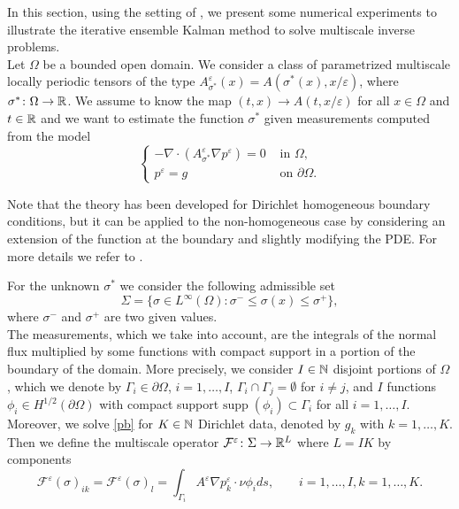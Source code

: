 In this section, using the setting of \cite{AbD18}, we present some numerical experiments to illustrate the iterative ensemble Kalman method to solve multiscale inverse problems. \\
Let $\Omega$ be a bounded open domain. We consider a class of parametrized multiscale locally periodic tensors of the type $A^{\varepsilon}_{\sigma^*}(x) = A(\sigma^*(x),x/\varepsilon)$, where $\sigma^* \colon \Omega \to \mathbb{R}$. We assume to know the map $(t,x) \to A(t,x/\varepsilon)$ for all $x \in \Omega$ and $t \in \mathbb{R}$ and we want to estimate the function $\sigma^*$ given measurements computed from the model
\begin{equation}
\label{pb}
\begin{cases}
- \nabla \cdot ( A^{\varepsilon}_{\sigma^*} \nabla p^{\varepsilon} ) = 0 & \text{ in } \Omega, \\
p^{\varepsilon} = g & \text{ on } \partial \Omega.
\end{cases}
\end{equation}
\begin{remark}
Note that the theory has been developed for Dirichlet homogeneous boundary conditions, but it can be applied to the non-homogeneous case by considering an extension of the function at the boundary and slightly modifying the PDE. For more details we refer to \cite[Remark 8.10]{Sal16}.
\end{remark}
For the unknown $\sigma^*$ we consider the following admissible set
\[ \Sigma = \{ \sigma \in L^{\infty}(\Omega) \colon \sigma^- \le \sigma(x) \le \sigma^+ \}, \]
where $\sigma^-$ and $\sigma^+$ are two given values. \\
The measurements, which we take into account, are the integrals of the normal flux multiplied by some functions with compact support in a portion of the boundary of the domain. More precisely, we consider $I \in \mathbb{N}$ disjoint portions of $\Omega$, which we denote by $\Gamma_i \in \partial \Omega$, $i = 1, \dots, I$, $\Gamma_i \cap \Gamma_j = \emptyset$ for $i \neq j$, and $I$ functions $\phi_i \in H^{1/2}(\partial \Omega)$ with compact support $\mathrm{supp} \; (\phi_i) \subset \Gamma_i$ for all $i = 1, \dots, I$. Moreover, we solve \eqref{pb} for $K \in \mathbb{N}$ Dirichlet data, denoted by $g_k$ with $k = 1, \dots, K$. Then we define the multiscale operator $\mathcal{F}^{\varepsilon} \colon \Sigma \to \mathbb{R}^L$ where $L = IK$ by components
\begin{equation}
\label{boundary_integral_e}
\mathcal{F}^{\varepsilon}(\sigma)_{ik} = \mathcal{F}^{\varepsilon}(\sigma)_{l} = \int_{\Gamma_i} A^{\varepsilon} \nabla p_k^{\varepsilon} \cdot \nu \phi_i ds, \qquad i = 1, \dots, I, k = 1, \dots, K.
\end{equation}
